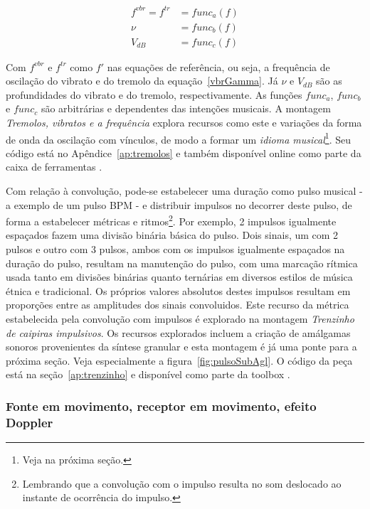 \begin{equation}\label{eq:vinculos}
\begin{split}
f^{vbr} = f^{tr} & = func_a(f) \\
\nu & = func_b(f) \\
V_{dB} & = func_c(f)
\end{split}
\end{equation}

Com $f^{vbr}$ e $f^{tr}$ como $f'$ nas equações de referência, ou seja, a frequência
de oscilação do vibrato e do tremolo da equação~\ref{vbrGamma}. Já $\nu$ e $V_{dB}$ são as profundidades
do vibrato e do tremolo, respectivamente. As funções $func_a$,
$func_b$ e $func_c$ são arbitrárias e dependentes das intenções musicais. A montagem 
\emph{Tremolos, vibratos e a frequência} explora
recursos como este e variações da forma de onda da oscilação com vínculos, de modo a formar um \emph{idioma musical}\footnote{Veja na próxima seção.}. Seu código está no Apêndice~\ref{ap:tremolos} e também disponível online como parte da caixa de ferramentas \massa.


Com relação à convolução, pode-se estabelecer uma duração como pulso musical - a exemplo de um pulso BPM - 
e distribuir impulsos no decorrer deste pulso, de forma a estabelecer métricas e ritmos\footnote{Lembrando
que a convolução com o impulso resulta no som deslocado ao instante de ocorrência do impulso.}.
Por exemplo, 2 impulsos igualmente espaçados fazem uma
divisão binária básica do pulso. Dois sinais, um com 2 pulsos e outro com 3 pulsos,
ambos com os impulsos igualmente espaçados na duração do pulso, resultam na manutenção
do pulso, com uma marcação rítmica usada tanto em divisões binárias quanto ternárias em diversos
estilos de música étnica e tradicional.\cite{Gramani} 
Os próprios valores absolutos destes impulsos resultam em proporções entre as amplitudes dos sinais
convoluidos.
Este recurso da métrica
estabelecida pela convolução com impulsos é explorado na montagem \emph{Trenzinho de caipiras impulsivos}. Os recursos explorados incluem a criação de amálgamas sonoros provenientes da síntese granular e esta montagem é já uma ponte para a próxima seção. Veja especialmente a figura~\ref{fig:pulsoSubAgl}. O código da peça está na seção~\ref{ap:trenzinho} e disponível como parte da toolbox \massa.

\subsubsection{Fonte em movimento, receptor em movimento, efeito Doppler}

